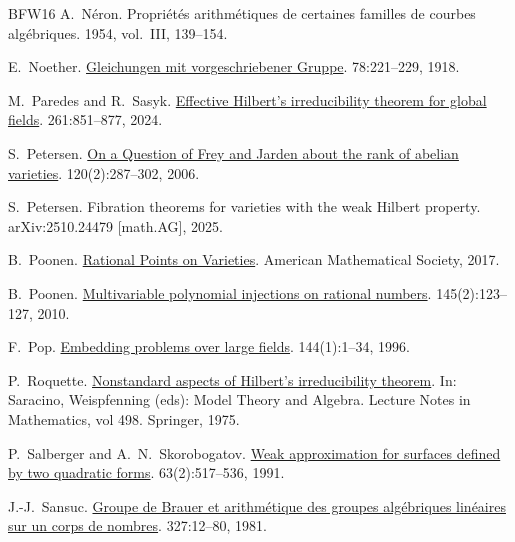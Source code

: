 \documentclass[10pt,a4paper]{amsart}
\theoremstyle{plain}
\theoremstyle{remark}
\numberwithin{theorem}{section}
\begin{document}
\begin{thebibliography}{BFW16}
A.~N\'eron.
\newblock Propri\'et\'es arithm\'etiques de certaines familles de courbes alg\'ebriques.
 1954, vol.~III, 139--154.

E.~Noether.
\newblock \href{https://doi.org/10.1007/BF01457099}{Gleichungen mit vorgeschriebener Gruppe}.
 78:221--229, 1918.

M.~Paredes and R.~Sasyk.
\newblock \href{https://doi.org/10.1007/s11856-023-2604-7}{Effective Hilbert’s irreducibility theorem for global fields}.
 261:851--877, 2024.

S.~Petersen.
\newblock \href{https://doi.org/10.1016/j.jnt.2005.12.006}{On a Question of Frey and Jarden about the rank of abelian varieties}.
 120(2):287--302, 2006.

S.~Petersen. 
\newblock
Fibration theorems for varieties with the weak Hilbert property.  
\newblock arXiv:2510.24479 [math.AG], 2025.

B.~Poonen.
\newblock \href{https://math.mit.edu/~poonen/papers/Qpoints.pdf}{Rational Points on Varieties}.
\newblock American Mathematical Society, 2017.

B.~Poonen. 
\newblock \href{https://doi.org/10.4064/aa145-2-2 }{Multivariable polynomial injections on rational numbers}.
 145(2):123--127, 2010.  

F.~Pop.
\newblock \href{https://doi.org/10.2307/2118581}{Embedding problems over large fields}.
 144(1):1--34, 1996.

P.~Roquette.
\newblock \href{https://doi.org/10.1007/BFb0080983}{Nonstandard aspects of Hilbert's irreducibility theorem}. 
\newblock In: Saracino, Weispfenning (eds): Model Theory and Algebra. Lecture Notes in Mathematics, vol 498. Springer, 1975. 

P.~Salberger and A.~N.~Skorobogatov.
\newblock \href{https://doi.org/10.1215/S0012-7094-91-06322-2}{Weak approximation for surfaces defined by two quadratic forms}.
 63(2):517--536, 1991.

J.-J.~Sansuc.
\newblock \href{https://eudml.org/doc/152382}{Groupe de Brauer et arithm\'etique des groupes alg\'ebriques lin\'eaires sur un corps de nombres}.
 327:12--80, 1981.	


\end{thebibliography}
\end{document}
